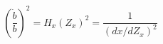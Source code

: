 \begin{equation}\label{difx}
(\frac{\dot{b}}{b})^2=H_x(Z_x)^2=\frac{1}{(dx/dZ_x)^2}
\end{equation}

